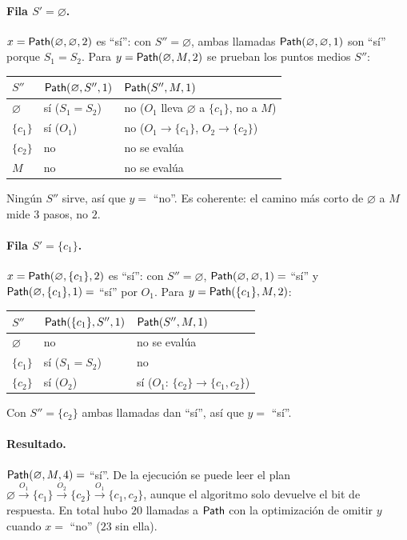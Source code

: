 \documentclass[11pt,letterpaper]{article}
\theoremstyle{plain}
\theoremstyle{definition}
\theoremstyle{remark}
\newcommand{\vacio}{\varnothing}
\newcommand{\nombreMat}[1]{\ensuremath{\text{\fontencoding{OT1}\fontfamily{cmss}\upshape\selectfont #1}}}
\newcommand{\Path}{\nombreMat{Path}}
\begin{document}
\paragraph{Fila $S'=\vacio$.} $x=\Path(\vacio,\vacio,2)$ es ``sí'': con $S''=\vacio$, ambas llamadas $\Path(\vacio,\vacio,1)$ son ``sí'' porque $S_1=S_2$.
Para $y=\Path(\vacio,M,2)$ se prueban los puntos medios $S''$:

\begin{center}
\begin{tabular}{@{}lll@{}}
\toprule
$S''$ & $\Path(\vacio,S'',1)$ & $\Path(S'',M,1)$\\
\midrule
$\vacio$ & sí ($S_1=S_2$) & no ($O_1$ lleva $\vacio$ a $\{c_1\}$, no a $M$)\\
$\{c_1\}$ & sí ($O_1$) & no ($O_1\to\{c_1\}$, $O_2\to\{c_2\}$)\\
$\{c_2\}$ & no & no se evalúa\\
$M$ & no & no se evalúa\\
\bottomrule
\end{tabular}
\end{center}
Ningún $S''$ sirve, así que $y=$ ``no''. Es coherente: el camino más corto de $\vacio$ a $M$ mide $3$ pasos, no $2$.

\paragraph{Fila $S'=\{c_1\}$.} $x=\Path(\vacio,\{c_1\},2)$ es ``sí'': con $S''=\vacio$, $\Path(\vacio,\vacio,1)=$ ``sí'' y $\Path(\vacio,\{c_1\},1)=$ ``sí'' por $O_1$.
Para $y=\Path(\{c_1\},M,2)$:

\begin{center}
\begin{tabular}{@{}lll@{}}
\toprule
$S''$ & $\Path(\{c_1\},S'',1)$ & $\Path(S'',M,1)$\\
\midrule
$\vacio$ & no & no se evalúa\\
$\{c_1\}$ & sí ($S_1=S_2$) & no\\
$\{c_2\}$ & sí ($O_2$) & sí ($O_1$: $\{c_2\}\to\{c_1,c_2\}$)\\
\bottomrule
\end{tabular}
\end{center}
Con $S''=\{c_2\}$ ambas llamadas dan ``sí'', así que $y=$ ``sí''.

\paragraph{Resultado.} $\Path(\vacio,M,4)=$ ``sí''. De la ejecución se puede leer el plan $\vacio\xrightarrow{O_1}\{c_1\}\xrightarrow{O_2}\{c_2\}\xrightarrow{O_1}\{c_1,c_2\}$, aunque el algoritmo solo devuelve el bit de respuesta.
En total hubo $20$ llamadas a $\Path$ con la optimización de omitir $y$ cuando $x=$ ``no'' ($23$ sin ella).
\end{document}
